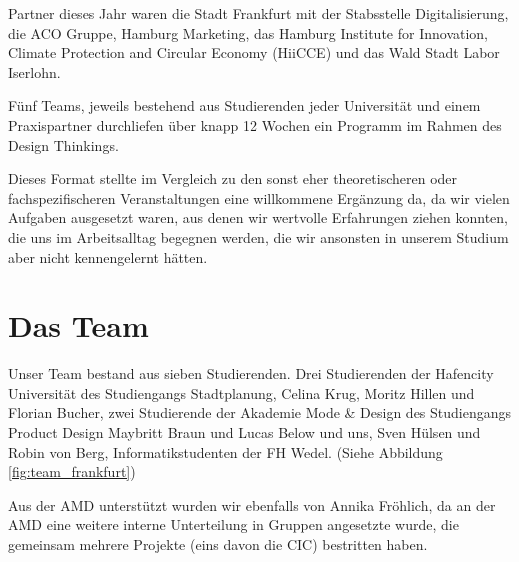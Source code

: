     Partner dieses Jahr waren die Stadt Frankfurt mit der Stabsstelle Digitalisierung, die ACO Gruppe, Hamburg Marketing, das Hamburg Institute for Innovation, Climate Protection and Circular Economy (HiiCCE) und das Wald Stadt Labor Iserlohn.

    Fünf Teams, jeweils bestehend aus Studierenden jeder Universität und einem Praxispartner durchliefen über knapp 12 Wochen ein Programm im Rahmen des Design Thinkings.

    Dieses Format stellte im Vergleich zu den sonst eher theoretischeren oder fachspezifischeren Veranstaltungen eine willkommene Ergänzung da, da wir vielen Aufgaben ausgesetzt waren, aus denen wir wertvolle Erfahrungen ziehen konnten, die uns im Arbeitsalltag begegnen werden, die wir ansonsten in unserem Studium aber nicht kennengelernt hätten.

\section{Das Team}

        Unser Team bestand aus sieben Studierenden. Drei Studierenden der Hafencity Universität des Studiengangs Stadtplanung, Celina Krug, Moritz Hillen und Florian Bucher, zwei Studierende der Akademie Mode \& Design des Studiengangs Product Design Maybritt Braun und Lucas Below und uns, Sven Hülsen und Robin von Berg, Informatikstudenten der FH Wedel. (Siehe Abbildung\,\ref{fig:team_frankfurt})

        Aus der AMD unterstützt wurden wir ebenfalls von Annika Fröhlich, da an der AMD eine weitere interne Unterteilung in Gruppen angesetzte wurde, die gemeinsam mehrere Projekte (eins davon die CIC) bestritten haben.

